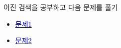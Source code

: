 \documentclass{oblivoir}
\begin{document}
    
\section{}
이진 검색을 공부하고 다음 문제를 풀기

\begin{itemize}
    \item \href{https://www.acmicpc.net/problem/2805}{\textcolor{blue}{문제1}}
    \item \href{https://www.acmicpc.net/problem/1654}{\textcolor{blue}{문제2}}
\end{itemize}
\end{document}
